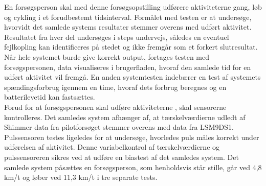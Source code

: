 En forsøgsperson skal med denne forsøgsopstilling udførere aktiviteterne gang, løb og cykling i et forudbestemt tidsinterval. Formålet med testen er at undersøge, hvorvidt det samlede systems resultater stemmer overens med udført aktivitet. Resultatet fra hver del undersøges i steps undervejs, således en eventuel fejlkopling kan identificeres på stedet og ikke fremgår som et forkert slutresultat. Når hele systemet burde give korrekt output, fortages testen med forsøgspersonen, data visualiseres i brugerfladen, hvoraf den samlede tid for en udført aktivitet vil fremgå. En anden systemtesten indebærer en test af systemets spændingsforbrug igennem en time, hvoraf dets forbrug beregnes og en batterilevetid kan fastsættes.\\
Forud for at forsøgspersonen skal udføre aktiviteterne%
, skal sensorerne kontrolleres. Det samledes system afhænger af, at tærskelværdierne udledt af Shimmer data fra pilotforsøget stemmer overens med data fra LSM9DS1. Pulssensoren testes ligeledes for at undersøge, hvorledes puls måles korrekt under udførelsen af aktivitet. Denne variabelkontrol af tærskelværdierne og pulssensoreren sikres ved at udføre en biastest af det samledes system. Det samlede system påsættes en forsøgsperson, som henholdsvis står stille, går ved 4,8 km/t og løber ved 11,3 km/t i tre separate tests.
